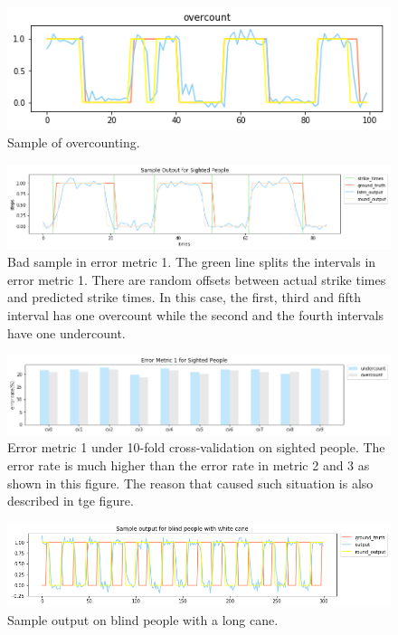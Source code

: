 \documentclass[11pt]{article}
\begin{document}
{\begin{figure}[ht]
\centering
\includegraphics[scale=0.4]{overcount}
\caption{Sample of overcounting.}
\label{fig:overcount}
\end{figure}


\begin{figure}[ht]
\centering
\includegraphics[scale=0.5]{output_small_metric2}
\caption{Bad sample in error metric 1. The green line splits the intervals in error metric 1. There are random offsets between actual strike times and predicted strike times. In this case, the first, third and fifth interval has one overcount while the second and the fourth intervals have one undercount.}
\label{fig:output_small_metric2}
\end{figure}




\begin{figure}[ht]
\centering
\includegraphics[scale=0.5]{error_metric_1_na_10fold}
\caption{Error metric 1 under 10-fold cross-validation on sighted people. The error rate is much higher than the error rate in metric 2 and 3 as shown in this figure. The reason that caused such situation is also described in tge figure.}
\label{fig:error_metric_1_na_10fold}
\end{figure}


\begin{figure}[ht]
\centering
\includegraphics[scale=0.5]{output_wc_1}
\caption{Sample output on blind people with a long cane.}
\label{fig:output_wc_1}
\end{figure}

}
\end{document}

